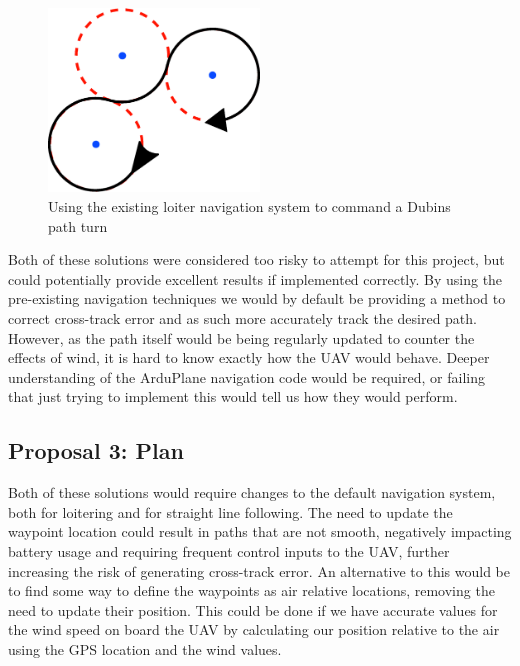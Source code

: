 \begin{figure}[htbp!] 
\centering    
\includegraphics[width=0.5\textwidth]{LoiterDubins}
\caption[Commanding a Dubins path turn using loiter navigation]{Using the existing loiter navigation system to command a Dubins path turn}
\label{fig:loiterdubins}
\end{figure} 

Both of these solutions were considered too risky to attempt for this project, but could potentially provide excellent results if implemented correctly. By using the pre-existing navigation techniques we would by default be providing a method to correct cross-track error and as such more accurately track the desired path. However, as the path itself would be being regularly updated to counter the effects of wind, it is hard to know exactly how the UAV would behave. Deeper understanding of the ArduPlane navigation code would be required, or failing that just trying to implement this would tell us how they would perform.  

\subsection{Proposal 3: Plan} 
\label{future:alternatedubinsplan}

Both of these solutions would require changes to the default navigation system, both for loitering and for straight line following. The need to update the waypoint location could result in paths that are not smooth, negatively impacting battery usage and requiring frequent control inputs to the UAV, further increasing the risk of generating cross-track error. An alternative to this would be to find some way to define the waypoints as air relative locations, removing the need to update their position. This could be done if we have accurate values for the wind speed on board the UAV by calculating our position relative to the air using the GPS location and the wind values. 

